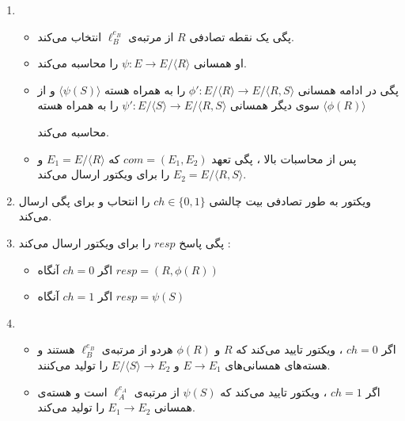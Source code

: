 \begin{enumerate}
	
\item {
\begin{itemize}
\item 
پگی یک نقطه تصادفی 
$R$
از مرتبه‌ی
$\ell_B^{e_B}$
انتخاب می‌کند.
	
\item 
او همسانی
$\psi : E \rightarrow E / \langle R \rangle$
را محاسبه می‌کند.
\item 
پگی در ادامه همسانی
${\phi}' : E / \langle R \rangle \rightarrow  E / \langle R,S \rangle $
را به همراه هسته
$\langle \psi(S) \rangle$
و از سوی دیگر همسانی   
${\psi}' : E / \langle S \rangle \rightarrow  E / \langle R,S \rangle $
را به همراه هسته 
$\langle \phi(R) \rangle$

 محاسبه می‌کند.
 \item 
 پس از محاسبات بالا ، پگی تعهد 
 $com = (E_1 , E_2)$
 که 
 $E_1 = E / \langle R \rangle$
 و
 $E_2 = E / \langle R,S \rangle$
‌ را برای ویکتور ارسال می‌کند.
 
\end{itemize}	
} %

\item 
ویکتور به طور تصادفی  بیت چالشی 
$ch \in \{0,1\}$
را انتحاب و برای پگی ارسال می‌کند.
\item 
پگی پاسخ 
$resp$
را برای ویکتور ارسال می‌کند :
\begin{itemize}
	\item
	اگر 
	$ch = 0$
	آنگاه
	$resp = (R,\phi(R))$
	
	\item
	اگر 
	$ch = 1$
	آنگاه
	$resp = \psi(S)$
	
\end{itemize}
\item {
\begin{itemize}
	\item 
	اگر
	$ch = 0 $
	، ویکتور تایید می‌کند که
	$R$
	و
	$\phi(R)$
	هردو از مرتبه‌ی 
	$\ell_B^{e_B}$
	هستند و هسته‌های همسانی‌های
	$E \rightarrow E_1$
	و 
	$E/ \langle S \rangle \rightarrow E_2$
	را تولید می‌کنند.
	\item 
	اگر 
	$ch = 1 $
	، ویکتور تایید می‌کند که 
	$\psi(S)$
	از مرتبه‌ی
	$\ell_A^{e_A}$
	است و هسته‌ی همسانی 
	$E_1 \rightarrow E_2$
	را تولید می‌کند.
\end{itemize}
} %
	
	
\end{enumerate}

